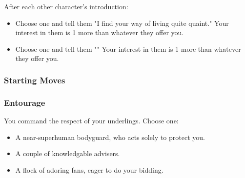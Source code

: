 After each other character's introduction:
\begin{itemize}
\item Choose one and tell them "I find your way of living quite quaint." Your interest in them is 1 more than whatever they offer you.
\item Choose one and tell them "" Your interest in them is 1 more than whatever they offer you.
\end{itemize}

\subsubsection{Starting Moves}

\subsubsection{Entourage}
You command the respect of your underlings. Choose one:
\begin{itemize}
\item A near-superhuman bodyguard, who acts solely to protect you.
\item A couple of knowledgable advisers.
\item A flock of adoring fans, eager to do your bidding.
\end{itemize}